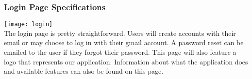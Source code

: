 \subsubsection{Login Page Specifications}
\texttt{[image: login]}\\
The login page is pretty straightforward. Users will create accounts with their email or may choose to log in with their gmail account. A password reset can be emailed to the user if they forgot their password. This page will also feature a logo that represents our application. Information about what the application does and available features can also be found on this page.\par
